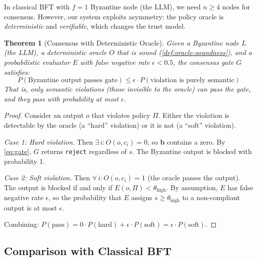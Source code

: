 \documentclass[11pt,a4paper]{article}
\newtheorem{theorem}{Theorem}[section]
\begin{document}
In classical BFT with $f = 1$ Byzantine node (the LLM), we need
$n \geq 4$ nodes for consensus.  However, our system exploits
asymmetry: the policy oracle is \emph{deterministic} and
\emph{verifiable}, which changes the trust model.

\begin{theorem}[Consensus with Deterministic Oracle]
\label{thm:consensus}
Given a Byzantine node $L$ (the LLM), a deterministic oracle $O$
that is sound (\cref{def:oracle-soundness}), and a probabilistic
evaluator $E$ with false negative rate $\epsilon < 0.5$, the
consensus gate $G$ satisfies:
\begin{equation}
  P(\text{Byzantine output passes gate}) \leq \epsilon \cdot P(\text{violation is purely semantic})
\end{equation}
That is, only semantic violations (those invisible to the oracle)
can pass the gate, and they pass with probability at most $\epsilon$.
\end{theorem}

\begin{proof}
Consider an output $o$ that violates policy $\Pi$.  Either the
violation is detectable by the oracle (a ``hard'' violation) or it
is not (a ``soft'' violation).

\emph{Case 1: Hard violation.}  Then $\exists\, i : O(o, c_i) = 0$,
so $\mathbf{b}$ contains a zero.  By \cref{eq:gate}, $G$ returns
\texttt{reject} regardless of $s$.  The Byzantine output is blocked
with probability 1.

\emph{Case 2: Soft violation.}  Then $\forall\, i : O(o, c_i) = 1$
(the oracle passes the output).  The output is blocked if and only
if $E(o, \Pi) < \theta_{\text{high}}$.  By assumption, $E$ has
false negative rate $\epsilon$, so the probability that $E$ assigns
$s \geq \theta_{\text{high}}$ to a non-compliant output is at most
$\epsilon$.

Combining: $P(\text{pass}) = 0 \cdot P(\text{hard}) + \epsilon \cdot P(\text{soft}) = \epsilon \cdot P(\text{soft})$.
\end{proof}

\subsection{Comparison with Classical BFT}
\end{document}
